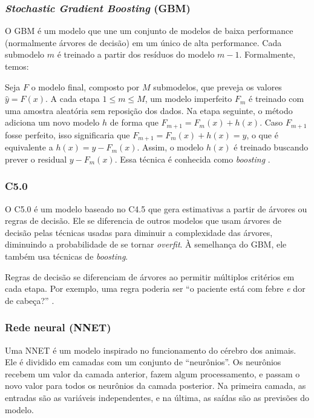 \documentclass[a4paper,titlepage]{ppgi}\usepackage[]{graphicx}\usepackage[]{color}
\begin{document}
\subsubsection{\emph{Stochastic Gradient Boosting} (GBM)}

O \gls{GBM} é um modelo que une um conjunto de modelos de baixa performance
(normalmente árvores de decisão) em um único de alta performance. Cada
submodelo $m$ é treinado a partir dos resíduos do modelo $m - 1$. Formalmente,
temos:

Seja $F$ o modelo final, composto por $M$ submodelos, que preveja os valores
$\hat{y} = F(x)$. A cada etapa $1 \le m \le M$, um modelo imperfeito $F_m$ é
treinado com uma amostra aleatória sem reposição dos dados. Na etapa seguinte,
o método adiciona um novo modelo $h$ de forma que $F_{m + 1} = F_m(x) + h(x)$.
Caso $F_{m + 1}$ fosse perfeito, isso significaria que $F_{m + 1} = F_m(x) +
h(x) = y$, o que é equivalente a $h(x) = y - F_m(x)$. Assim, o modelo $h(x)$ é
treinado buscando prever o residual $y - F_m(x)$. Essa técnica é conhecida como
\emph{boosting} \cite{Kuhn2013}.

\subsubsection{C5.0}

O C5.0 é um modelo baseado no C4.5 que gera estimativas a partir de árvores ou
regras de decisão. Ele se diferencia de outros modelos que usam árvores de
decisão pelas técnicas usadas para diminuir a complexidade das árvores,
diminuindo a probabilidade de se tornar \emph{overfit}. À semelhança do
\gls{GBM}, ele também usa técnicas de \emph{boosting}.

Regras de decisão se diferenciam de árvores ao permitir múltiplos critérios em
cada etapa. Por exemplo, uma regra poderia ser ``o paciente está com febre
\emph{e} dor de cabeça?'' \cite{Kuhn2013}.

\subsubsection{Rede neural (NNET)}

Uma \gls{NNET} é um modelo inspirado no funcionamento do cérebro dos animais.
Ele é dividido em camadas com um conjunto de ``neurônios''. Os neurônios
recebem um valor da camada anterior, fazem algum processamento, e passam o novo
valor para todos os neurônios da camada posterior. Na primeira camada, as
entradas são as variáveis independentes, e na última, as saídas são as
previsões do modelo.
\end{document}
